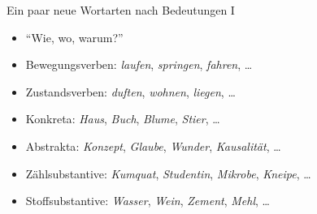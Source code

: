 \begin{frame}
  {Ein paar neue Wortarten nach Bedeutungen I}
  \pause
  \begin{itemize}[<+->]
    \item "`Wie, wo, warum?"' 
      \Halbzeile
      \pause
    \item \alert{Bewegungsverben}: \textit{laufen}, \textit{springen}, \textit{fahren}, \dots
    \item \alert{Zustandsverben}: \textit{duften}, \textit{wohnen}, \textit{liegen}, \dots
      \Halbzeile
    \item \alert{Konkreta}: \textit{Haus}, \textit{Buch}, \textit{Blume}, \textit{Stier}, \dots
    \item \alert{Abstrakta}: \textit{Konzept}, \textit{Glaube}, \textit{Wunder}, \textit{Kausalität}, \dots
      \Halbzeile
    \item \alert{Zählsubstantive}: \textit{Kumquat}, \textit{Studentin}, \textit{Mikrobe}, \textit{Kneipe}, \dots
    \item \alert{Stoffsubstantive}: \textit{Wasser}, \textit{Wein}, \textit{Zement}, \textit{Mehl}, \dots
  \end{itemize}
\end{frame}


